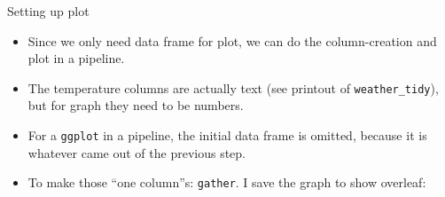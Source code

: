 \documentclass[ignorenonframetext,]{beamer}
\newenvironment{Shaded}{\begin{snugshade}}{\end{snugshade}}
\newcommand{\DataTypeTok}[1]{\textcolor[rgb]{0.13,0.29,0.53}{#1}}
\newcommand{\KeywordTok}[1]{\textcolor[rgb]{0.13,0.29,0.53}{\textbf{#1}}}
\newcommand{\NormalTok}[1]{#1}
\newcommand{\OperatorTok}[1]{\textcolor[rgb]{0.81,0.36,0.00}{\textbf{#1}}}
\newcommand{\StringTok}[1]{\textcolor[rgb]{0.31,0.60,0.02}{#1}}
\providecommand{\tightlist}{%
  \setlength{\itemsep}{0pt}\setlength{\parskip}{0pt}}
\begin{document}
\begin{frame}[fragile]{Setting up plot}
\protect\hypertarget{setting-up-plot}{}

\begin{itemize}
\tightlist
\item
  Since we only need data frame for plot, we can do the column-creation
  and plot in a pipeline.
\item
  The temperature columns are actually text (see printout of
  \texttt{weather\_tidy}), but for graph they need to be numbers.
\item
  For a \texttt{ggplot} in a pipeline, the initial data frame is
  omitted, because it is whatever came out of the previous step.
\item
  To make those ``one column''s: \texttt{gather}. I save the graph to
  show overleaf:
\end{itemize}

\begin{Shaded}
\end{Shaded}

\end{frame}
\end{document}
